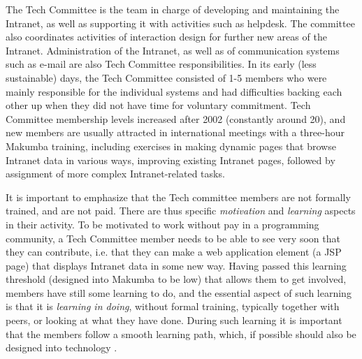 \documentclass{chi2009}
\begin{document}
The Tech Committee is the team in charge of developing and maintaining the Intranet, as well as supporting it with activities such as helpdesk. The committee also coordinates activities of interaction design for further new areas of the Intranet. Administration of the Intranet, as well as of communication systems such as e-mail are also Tech Committee responsibilities. In its early (less sustainable) days, the Tech Committee consisted of 1-5 members who were mainly responsible for the individual systems and had difficulties backing each other up when they did not have time for voluntary commitment. Tech Committee membership levels increased after 2002 (constantly around 20), and new members are usually attracted in international meetings with a three-hour Makumba training, including exercises in making dynamic pages that browse Intranet data in various ways, improving existing Intranet pages, followed by assignment of more complex Intranet-related tasks.



It is important to emphasize that the Tech committee members are not formally trained, and are not paid. There are thus specific \textit{motivation} and \textit{learning} aspects in their activity. To be motivated to work without pay in a programming community, a Tech Committee member needs to be able to see very soon that they can contribute, i.e. that they can make a web application element (a JSP page) that displays Intranet data in some new way. Having passed this learning threshold (designed into Makumba to be low) that allows them to get involved, members have still some learning to do, and the essential aspect of such learning is that it is \textit {learning in doing}, without formal training, typically together with peers, or looking at what they have done. During such learning it is important that the members follow a smooth learning path, which, if possible should also be designed into technology \cite{bogdan_mayer09}.

\end{document}
